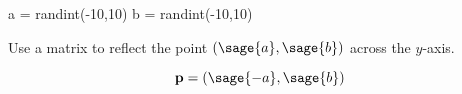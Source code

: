 \documentclass{ximera}
\author{Jenny Sheldon \and Bart Snapp}
\begin{document}
\makerandom
 
\begin{sagesilent}
  a = randint(-10,10)
  b = randint(-10,10)
\end{sagesilent}

\begin{exercise}
  Use a matrix to reflect the point $(\sage{a},\sage{b})$ across the
  $y$-axis.
  \begin{prompt}
    \[
    \vec{p} = (\sage{-a},\sage{b})
    \]
  \end{prompt}
\end{exercise}
\end{document}

